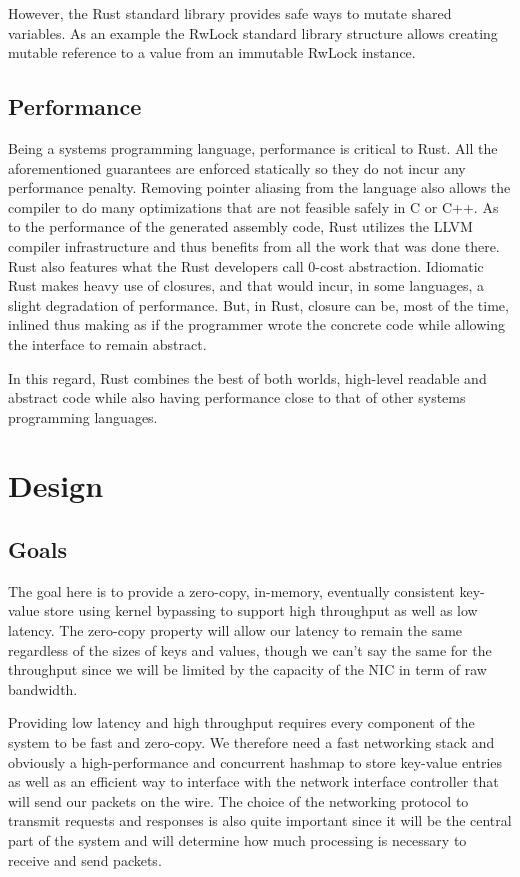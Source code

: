 \documentclass[11pt]{article}
\begin{document}
However, the Rust standard library provides safe ways to mutate shared
variables. As an example the RwLock standard library structure allows
creating mutable reference to a value from an immutable RwLock instance.

\subsection{Performance}

Being a systems programming language, performance is critical to
Rust. All the aforementioned guarantees are enforced statically so
they do not incur any performance penalty. Removing pointer aliasing
from the language also allows the compiler to do many optimizations
that are not feasible safely in C or C++. As to the performance of the
generated assembly code, Rust utilizes the LLVM compiler
infrastructure and thus benefits from all the work that was done
there. Rust also features what the Rust developers call 0-cost
abstraction. Idiomatic Rust makes heavy use of closures, and that
would incur, in some languages, a slight degradation of
performance. But, in Rust, closure can be, most of the time, inlined
thus making as if the programmer wrote the concrete code while
allowing the interface to remain abstract.

In this regard, Rust combines the best of both worlds, high-level
readable and abstract code while also having performance close to that
of other systems programming languages.

\section{Design}

\subsection{Goals} \label{design-goals}

The goal here is to provide a zero-copy, in-memory, eventually
consistent key-value store using kernel bypassing to support high
throughput as well as low latency. The zero-copy property will allow
our latency to remain the same regardless of the sizes of keys and
values, though we can't say the same for the throughput since we will
be limited by the capacity of the NIC in term of raw bandwidth.

Providing low latency and high throughput requires every component of
the system to be fast and zero-copy. We therefore need a fast
networking stack and obviously a high-performance and concurrent
hashmap to store key-value entries as well as an efficient way to
interface with the network interface controller that will send our
packets on the wire. The choice of the networking protocol to transmit
requests and responses is also quite important since it will be the
central part of the system and will determine how much processing is
necessary to receive and send packets.
\end{document}

